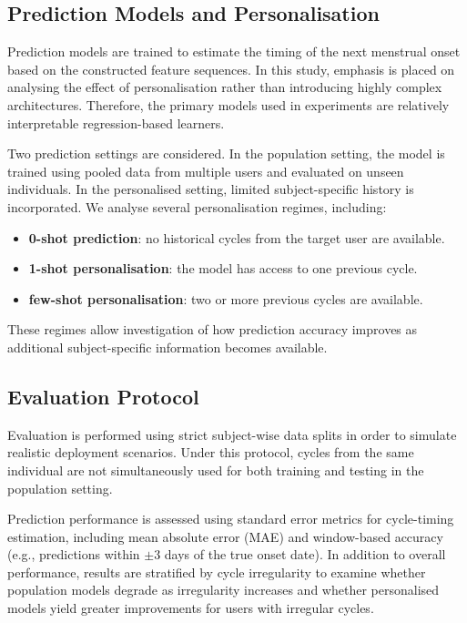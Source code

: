 \documentclass[conference]{IEEEtran}
\begin{document}
\subsection{Prediction Models and Personalisation}

Prediction models are trained to estimate the timing of the next menstrual onset based on the constructed feature sequences. In this study, emphasis is placed on analysing the effect of personalisation rather than introducing highly complex architectures. Therefore, the primary models used in experiments are relatively interpretable regression-based learners.

Two prediction settings are considered. In the population setting, the model is trained using pooled data from multiple users and evaluated on unseen individuals. In the personalised setting, limited subject-specific history is incorporated. We analyse several personalisation regimes, including:

\begin{itemize}
\item \textbf{0-shot prediction}: no historical cycles from the target user are available.
\item \textbf{1-shot personalisation}: the model has access to one previous cycle.
\item \textbf{few-shot personalisation}: two or more previous cycles are available.
\end{itemize}

These regimes allow investigation of how prediction accuracy improves as additional subject-specific information becomes available.

\subsection{Evaluation Protocol}

Evaluation is performed using strict subject-wise data splits in order to simulate realistic deployment scenarios. Under this protocol, cycles from the same individual are not simultaneously used for both training and testing in the population setting.

Prediction performance is assessed using standard error metrics for cycle-timing estimation, including mean absolute error (MAE) and window-based accuracy (e.g., predictions within $\pm3$ days of the true onset date). In addition to overall performance, results are stratified by cycle irregularity to examine whether population models degrade as irregularity increases and whether personalised models yield greater improvements for users with irregular cycles.
\end{document}
